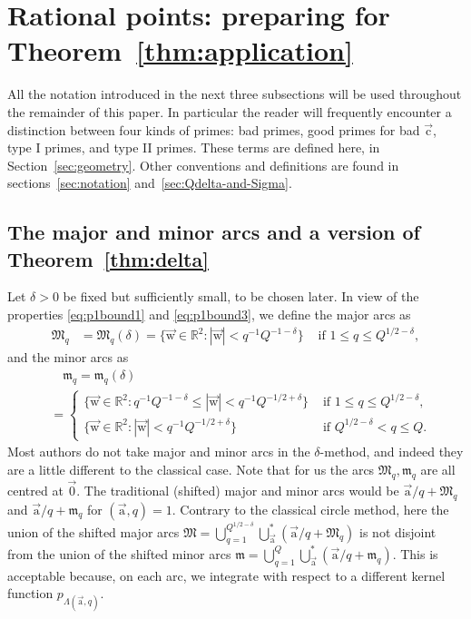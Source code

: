\documentclass[letterpaper,11pt]{amsart}
\numberwithin{equation}{section}
\theoremstyle{definition}
\numberwithin{equation}{section}
\newcommand{\ua}{\vec{\mathrm{a}}}
\newcommand{\uw}{{\vec{\mathrm{w}}}}
\newcommand{\uc}{{\vec{\mathrm{c}}}}
\begin{document}
\section{Rational points: preparing for Theorem~\ref{thm:application}} 
\label{sec:quad-forms-basic-notation}

All the notation introduced in the next three subsections will be used throughout the remainder of this paper.
In particular the reader will frequently encounter a distinction between four kinds of primes: bad primes, good primes for bad $\uc$, type I primes, and type II primes. These terms are defined here, in Section~\ref{sec:geometry}. Other conventions and definitions are found in sections~\ref{sec:notation} and~\ref{sec:Qdelta-and-Sigma}.


\subsection{The major and minor arcs and a version of Theorem~\ref{thm:delta}}\label{sec:delta2}
  Let $\delta>0$ be fixed but sufficiently small, to be chosen later. 
 In view of the properties \eqref{eq:p1bound1} and \eqref{eq:p1bound3}, we define the major arcs as 
 \begin{align*}%
 \mathfrak M_q&=\mathfrak M_{q}(\delta) =\Big\{\uw\in \mathbb R^2: |\uw|< q^{-1}Q^{-1-\delta}\Big\}
 &\text{ if }1\leq q\leq Q^{1/2-\delta},
 \end{align*}
 {and the minor arcs as}
  \begin{align}
 \label{minorarc}
 &\quad \mathfrak m_q=\mathfrak m_{q}(\delta)\\&=\begin{cases}
 \big\{\uw \in \mathbb R^2: q^{-1}Q^{-1-\delta}\leq |\uw| <q^{-1}Q^{-1/2+\delta}\big\} & \text{ if } 1\leq q\leq Q^{1/2-\delta},\\
 \big\{\uw\in \mathbb R^2: |\uw|< q^{-1}Q^{-1/2+\delta}\big\} & \text{ if }Q^{1/2-\delta}< q\leq Q.
 \end{cases}
 \nonumber
 \end{align}
Most authors do not take major and minor arcs in the \(\delta\)-method, and indeed they are a little different to the classical case.
Note that for us the arcs \(\mathfrak M_q,\mathfrak m_q\) are all centred at $\vec{0}$. The traditional (shifted) major and minor arcs would be \(\ua/q+\mathfrak M_q\) and \(\ua/q+\mathfrak m_q\) for \((\ua,q)=1\). Contrary to the classical circle method, here the union of the shifted major arcs $\mathfrak M = \bigcup_{q=1}^{Q^{1/2-\delta}} \bigcup_{\ua}^*(\ua/q+{\mathfrak M}_q) $ is not disjoint from the union of the shifted minor arcs $\mathfrak m = \bigcup_{q=1}^{Q} \bigcup_{\ua}^*(\ua/q+{\mathfrak m}_q) $. This is acceptable because, on each arc, we integrate  with respect to a different kernel function \(p_{\Lambda(\ua,q)}\).
\end{document}
